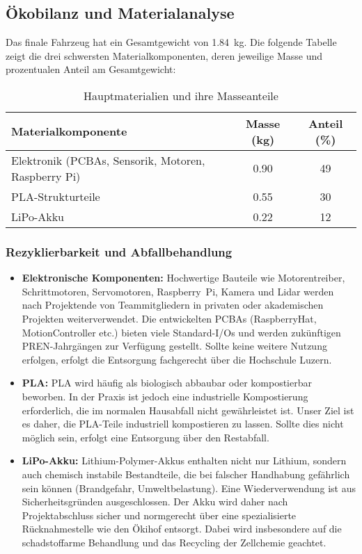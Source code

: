 \documentclass[main.tex]{subfiles} %
\begin{document}

\subsection{Ökobilanz und Materialanalyse}

Das finale Fahrzeug hat ein Gesamtgewicht von \SI{1.84}{\kilo\gram}. Die folgende 
Tabelle zeigt die drei schwersten Materialkomponenten, deren jeweilige Masse und 
prozentualen Anteil am Gesamtgewicht:

\begin{table}[H]
\centering
\begin{tabular}{|l|c|c|}
\hline
\textbf{Materialkomponente} & \textbf{Masse (kg)} & \textbf{Anteil (\%)} \\
\hline
Elektronik (PCBAs, Sensorik, Motoren, Raspberry Pi) & 0.90 & 49 \\
PLA-Strukturteile & 0.55 & 30 \\
LiPo-Akku & 0.22 & 12 \\
\hline
\end{tabular}
\caption{Hauptmaterialien und ihre Masseanteile}
\end{table}

\subsubsection*{Rezyklierbarkeit und Abfallbehandlung}

\begin{itemize}
    \item \textbf{Elektronische Komponenten:} 
    Hochwertige Bauteile wie Motorentreiber, Schrittmotoren, Servomotoren, 
    Raspberry~Pi, Kamera und Lidar werden nach Projektende von Teammitgliedern in 
    privaten oder akademischen Projekten weiterverwendet. Die entwickelten PCBAs 
    (RaspberryHat, MotionController etc.) bieten viele Standard-I/Os und werden 
    zukünftigen PREN-Jahrgängen zur Verfügung gestellt. Sollte keine weitere Nutzung 
    erfolgen, erfolgt die Entsorgung fachgerecht über die Hochschule Luzern.
    
    \item \textbf{PLA:} 
    PLA wird häufig als biologisch abbaubar oder kompostierbar beworben. In der 
    Praxis ist jedoch eine industrielle Kompostierung erforderlich, die im normalen 
    Hausabfall nicht gewährleistet ist. Unser Ziel ist es daher, die PLA-Teile 
    industriell kompostieren zu lassen. Sollte dies nicht möglich sein, erfolgt 
    eine Entsorgung über den Restabfall.
    
    \item \textbf{LiPo-Akku:} 
    Lithium-Polymer-Akkus enthalten nicht nur Lithium, sondern auch chemisch 
    instabile Bestandteile, die bei falscher Handhabung gefährlich sein können 
    (Brandgefahr, Umweltbelastung). Eine Wiederverwendung ist aus Sicherheitsgründen 
    ausgeschlossen. Der Akku wird daher nach Projektabschluss sicher und normgerecht 
    über eine spezialisierte Rücknahmestelle wie den Ökihof entsorgt. Dabei wird 
    insbesondere auf die schadstoffarme Behandlung und das Recycling der Zellchemie 
    geachtet.
\end{itemize}
\end{document}
